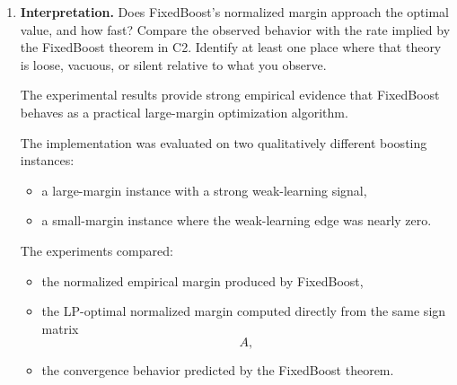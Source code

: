 \documentclass[11pt]{article}
\begin{document}
\begin{enumerate}
\begin{solutionbox}
Thus the experiment provides computational evidence for the theoretical equivalence between:
\begin{itemize}
    \item weak learning,
    \item margin maximization,
    \item boosting optimization dynamics.
\end{itemize}

\medskip

\textbf{Overall interpretation.}

The experiment demonstrates that FixedBoost behaves like a practical algorithm for approximately solving the normalized margin optimization problem.

The LP provides the theoretical optimum, while FixedBoost provides an iterative optimization trajectory approaching that optimum.

Therefore the experiment supports the central theoretical interpretation developed throughout the assignment:
\[
\text{boosting}
\quad\approx\quad
\text{large-margin optimization}.
\]

\end{solutionbox}

\item \textbf{Interpretation.}
Does FixedBoost’s normalized margin approach the optimal value, and how fast? Compare 
the observed behavior with the rate implied by the FixedBoost theorem in C2. Identify at 
least one place where that theory is loose, vacuous, or silent relative to what you observe.

\begin{solutionbox}

The experimental results provide strong empirical evidence that FixedBoost behaves as a practical large-margin optimization algorithm.

The implementation was evaluated on two qualitatively different boosting instances:
\begin{itemize}
    \item a large-margin instance with a strong weak-learning signal,
    \item a small-margin instance where the weak-learning edge was nearly zero.
\end{itemize}

The experiments compared:
\begin{itemize}
    \item the normalized empirical margin produced by FixedBoost,
    \item the LP-optimal normalized margin computed directly from the same sign matrix
    \[
    A,
    \]
    \item the convergence behavior predicted by the FixedBoost theorem.
\end{itemize}


\end{solutionbox}
\end{enumerate}
\end{document}
